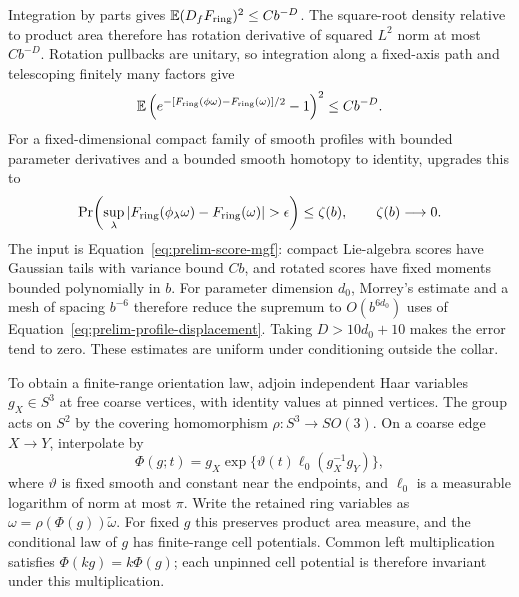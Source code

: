 Integration by parts gives
$\mathbb E(D_fF_{\rm ring})^2\le Cb^{-D}$. The square-root density relative
to product area therefore has rotation derivative of squared
$L^2$ norm at most $Cb^{-D}$. Rotation pullbacks are unitary, so
integration along a fixed-axis path and telescoping finitely many
factors give
\begin{equation}
 \mathbb E\left(e^{-[F_{\rm ring}(\phi\omega)-F_{\rm ring}(\omega)]/2}-1\right)^2
 \le Cb^{-D}.
 \label{eq:prelim-profile-displacement}
\end{equation}
For a fixed-dimensional compact family of smooth profiles with bounded
parameter derivatives and a bounded smooth homotopy to identity,
 upgrades this to
\begin{equation}
 \Pr\!\left(\sup_\lambda
 |F_{\rm ring}(\phi_\lambda\omega)-F_{\rm ring}(\omega)|>\epsilon\right)
 \le\zeta(b),\qquad\zeta(b)\longrightarrow0.
 \label{eq:prelim-profile-uniform}
\end{equation}
The input is Equation~\eqref{eq:prelim-score-mgf}: compact Lie-algebra
scores have Gaussian tails with variance bound $Cb$, and rotated
scores have fixed moments bounded polynomially in $b$. For parameter
dimension $d_0$, Morrey's estimate and a mesh of spacing $b^{-6}$
therefore reduce the supremum to $O(b^{6d_0})$ uses of
Equation~\eqref{eq:prelim-profile-displacement}. Taking
$D>10d_0+10$ makes the error tend to zero. These estimates are uniform
under conditioning outside the collar.

To obtain a finite-range orientation law, adjoin independent Haar
variables $g_X\in S^3$ at free coarse vertices, with identity values at
pinned vertices. The group acts on $S^2$ by the covering homomorphism
$\rho:S^3\to SO(3)$. On a coarse edge $X\to Y$, interpolate by
\[
 \Phi(g;t)=g_X\exp\{\vartheta(t)\ell_0(g_X^{-1}g_Y)\},
\]
where $\vartheta$ is fixed smooth and constant near the endpoints, and
$\ell_0$ is a measurable logarithm of norm at most $\pi$. Write the
retained ring variables as $\omega=\rho(\Phi(g))\widetilde\omega$.
For fixed $g$ this preserves product area measure, and the conditional
law of $g$ has finite-range cell potentials. Common left multiplication
satisfies $\Phi(kg)=k\Phi(g)$; each unpinned cell potential is therefore
invariant under this multiplication.

